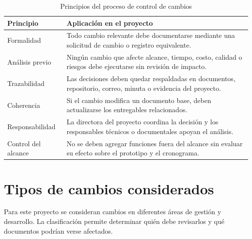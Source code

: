 \documentclass[11pt,spanish]{article}
\begin{document}
\begin{table}[H]
\centering
\caption{Principios del proceso de control de cambios}
\label{tab:principios-cambios}
{\small
\begin{tabularx}{\textwidth}{p{4cm} Y}
\toprule
\textbf{Principio} & \textbf{Aplicación en el proyecto} \\
\midrule
Formalidad & Todo cambio relevante debe documentarse mediante una solicitud de cambio o registro equivalente. \\
Análisis previo & Ningún cambio que afecte alcance, tiempo, costo, calidad o riesgos debe ejecutarse sin revisión de impacto. \\
Trazabilidad & Las decisiones deben quedar respaldadas en documentos, repositorio, correo, minuta o evidencia del proyecto. \\
Coherencia & Si el cambio modifica un documento base, deben actualizarse los entregables relacionados. \\
Responsabilidad & La directora del proyecto coordina la decisión y los responsables técnicos o documentales apoyan el análisis. \\
Control del alcance & No se deben agregar funciones fuera del alcance sin evaluar su efecto sobre el prototipo y el cronograma. \\
\bottomrule
\end{tabularx}
}
\end{table}

\section{Tipos de cambios considerados}

Para este proyecto se consideran cambios en diferentes áreas de gestión y desarrollo. La clasificación permite determinar quién debe revisarlos y qué documentos podrían verse afectados.
\end{document}
